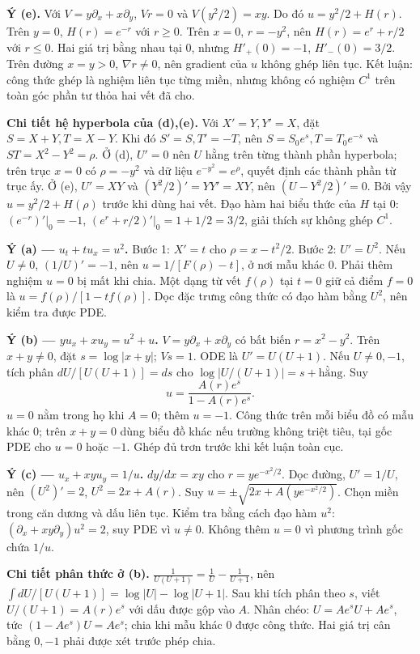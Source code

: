 \textbf{Ý (e).} Với $V=y\partial_x+x\partial_y$, $Vr=0$ và $V(y^2/2)=xy$. Do đó $u=y^2/2+H(r)$. Trên $y=0$, $H(r)=e^{-r}$ với $r\ge0$. Trên $x=0$, $r=-y^2$, nên $H(r)=e^r+r/2$ với $r\le0$. Hai giá trị bằng nhau tại 0, nhưng $H'_+(0)=-1$, $H'_-(0)=3/2$. Trên đường $x=y>0$, $\nabla r\ne0$, nên gradient của $u$ không ghép liên tục. Kết luận: công thức ghép là nghiệm liên tục từng miền, nhưng không có nghiệm $C^1$ trên toàn góc phần tư thỏa hai vết đã cho.

\textbf{Chi tiết hệ hyperbola của (d),(e).} Với $X'=Y,Y'=X$, đặt $S=X+Y,T=X-Y$. Khi đó $S'=S,T'=-T$, nên $S=S_0e^s,T=T_0e^{-s}$ và $ST=X^2-Y^2=\rho$. Ở (d), $U'=0$ nên $U$ hằng trên từng thành phần hyperbola; trên trục $x=0$ có $\rho=-y^2$ và dữ liệu $e^{-y^2}=e^\rho$, quyết định các thành phần từ trục ấy. Ở (e), $U'=XY$ và $(Y^2/2)'=YY'=XY$, nên $(U-Y^2/2)'=0$. Bởi vậy $u=y^2/2+H(\rho)$ trước khi dùng hai vết. Đạo hàm hai biểu thức của $H$ tại $0$: $(e^{-r})'|_0=-1$, $(e^r+r/2)'|_0=1+1/2=3/2$, giải thích sự không ghép $C^1$.

\textbf{Ý (a) — $u_t+tu_x=u^2$.} Bước 1: $X'=t$ cho $\rho=x-t^2/2$. Bước 2: $U'=U^2$. Nếu $U\ne0$, $(1/U)'=-1$, nên $u=1/[F(\rho)-t]$, ở nơi mẫu khác 0. Phải thêm nghiệm $u=0$ bị mất khi chia. Một dạng từ vết $f(\rho)$ tại $t=0$ giữ cả điểm $f=0$ là $u=f(\rho)/[1-tf(\rho)]$. Dọc đặc trưng công thức có đạo hàm bằng $U^2$, nên kiểm tra được PDE.

\textbf{Ý (b) — $yu_x+xu_y=u^2+u$.} $V=y\partial_x+x\partial_y$ có bất biến $r=x^2-y^2$. Trên $x+y\ne0$, đặt $s=\log|x+y|$; $Vs=1$. ODE là $U'=U(U+1)$. Nếu $U\ne0,-1$, tích phân $dU/[U(U+1)]=ds$ cho $\log|U/(U+1)|=s+\text{hằng}$. Suy
\[u=\frac{A(r)e^s}{1-A(r)e^s}.\]
$u=0$ nằm trong họ khi $A=0$; thêm $u=-1$. Công thức trên mỗi biểu đồ có mẫu khác 0; trên $x+y=0$ dùng biểu đồ khác nếu trường không triệt tiêu, tại gốc PDE cho $u=0$ hoặc $-1$. Ghép đủ trơn trước khi kết luận toàn cục.

\textbf{Ý (c) — $u_x+xyu_y=1/u$.} $dy/dx=xy$ cho $r=ye^{-x^2/2}$. Dọc đường, $U'=1/U$, nên $(U^2)'=2$, $U^2=2x+A(r)$. Suy $u=\pm\sqrt{2x+A(ye^{-x^2/2})}$. Chọn miền trong căn dương và dấu liên tục. Kiểm tra bằng cách đạo hàm $u^2$: $(\partial_x+xy\partial_y)u^2=2$, suy PDE vì $u\ne0$. Không thêm $u=0$ vì phương trình gốc chứa $1/u$.

\textbf{Chi tiết phân thức ở (b).} $\frac1{U(U+1)}=\frac1U-\frac1{U+1}$, nên $\int dU/[U(U+1)]=\log|U|-\log|U+1|$. Sau khi tích phân theo $s$, viết $U/(U+1)=A(r)e^s$ với dấu được gộp vào $A$. Nhân chéo: $U=Ae^sU+Ae^s$, tức $(1-Ae^s)U=Ae^s$; chia khi mẫu khác $0$ được công thức. Hai giá trị cân bằng $0,-1$ phải được xét trước phép chia.

